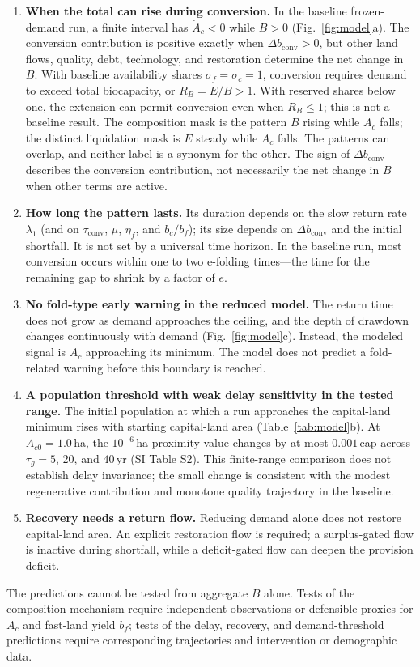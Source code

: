 \documentclass[preprint,12pt,authoryear]{elsarticle}
\newcommand{\dconv}{\Delta b_{\mathrm{conv}}}
\newcommand{\tconv}{\tau_{\mathrm{conv}}}
\begin{document}
\begin{enumerate}[label=P\arabic*.,leftmargin=2.2em]
\item \textbf{When the total can rise during conversion.} In the baseline frozen-demand run, a finite interval has $\dot A_c<0$ while $\dot B>0$ (Fig.~\ref{fig:model}a). The conversion contribution is positive exactly when $\dconv>0$, but other land flows, quality, debt, technology, and restoration determine the net change in $B$. With baseline availability shares $\sigma_f=\sigma_c=1$, conversion requires demand to exceed total biocapacity, or $R_B=E/B>1$. With reserved shares below one, the extension can permit conversion even when $R_B\le1$; this is not a baseline result. The composition mask is the pattern $B$ rising while $A_c$ falls; the distinct liquidation mask is $E$ steady while $A_c$ falls. The patterns can overlap, and neither label is a synonym for the other. The sign of $\dconv$ describes the conversion contribution, not necessarily the net change in $B$ when other terms are active.
\item \textbf{How long the pattern lasts.} Its duration depends on the slow return rate $\lambda_1$ (and on $\tconv$, $\mu$, $\eta_f$, and $b_c/b_f$); its size depends on $\dconv$ and the initial shortfall. It is not set by a universal time horizon. In the baseline run, most conversion occurs within one to two e-folding times—the time for the remaining gap to shrink by a factor of $e$.
\item \textbf{No fold-type early warning in the reduced model.} The return time does not grow as demand approaches the ceiling, and the depth of drawdown changes continuously with demand (Fig.~\ref{fig:model}c). Instead, the modeled signal is $A_c$ approaching its minimum. The model does not predict a fold-related warning before this boundary is reached.
\item \textbf{A population threshold with weak delay sensitivity in the tested range.} The initial population at which a run approaches the capital-land minimum rises with starting capital-land area (Table~\ref{tab:model}b). At $A_{c0}=1.0$\,ha, the $10^{-6}$\,ha proximity value changes by at most $0.001$\,cap across $\tau_g=5$, $20$, and $40$\,yr (SI Table S2). This finite-range comparison does not establish delay invariance; the small change is consistent with the modest regenerative contribution and monotone quality trajectory in the baseline.
\item \textbf{Recovery needs a return flow.} Reducing demand alone does not restore capital-land area. An explicit restoration flow is required; a surplus-gated flow is inactive during shortfall, while a deficit-gated flow can deepen the provision deficit.
\end{enumerate}
The predictions cannot be tested from aggregate $B$ alone. Tests of the composition mechanism require independent observations or defensible proxies for $A_c$ and fast-land yield $b_f$; tests of the delay, recovery, and demand-threshold predictions require corresponding trajectories and intervention or demographic data.
\clearpage
\end{document}
